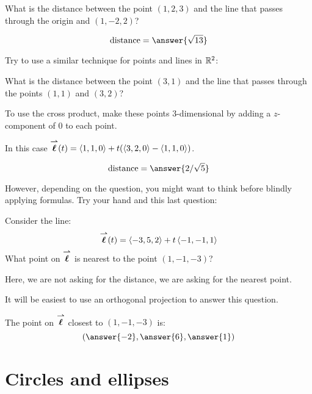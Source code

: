 \documentclass{ximera}
\begin{document}
\begin{question}
  What is the distance between the point $(1,2,3)$ and the line that
  passes through the origin and $(1,-2,2)$?
  \begin{prompt}
    \[
    \mathrm{distance} = \answer{\sqrt{13}}
    \]
  \end{prompt}
\end{question}

Try to use a similar technique for points and lines in $\mathbb R^2$:

\begin{question}
  What is the distance between the point $(3,1)$ and the line that
  passes through the points $(1,1)$ and $(3,2)$?
   \begin{hint}
    To use the cross product, make these points $3$-dimensional by
    adding a $z$-component of $0$ to each point.
  \end{hint}
  \begin{hint}
    In this case ${\overset{\boldsymbol{\rightharpoonup}}{\mathbf{\boldsymbol{\ell}}}}(t) = \left\langle 1,1,0\right\rangle + t
    (\left\langle 3,2,0\right\rangle-\left\langle 1,1,0\right\rangle)$.
  \end{hint}
  \begin{prompt}
    \[
    \mathrm{distance} = \answer{2/\sqrt{5}}
    \]
  \end{prompt}
\end{question}

However, depending on the question, you might want to think before
blindly applying formulas. Try your hand and this last question:

\begin{question}
  Consider the line:
  \[
  {\overset{\boldsymbol{\rightharpoonup}}{\mathbf{\boldsymbol{\ell}}}}(t) = \left\langle -3,5,2\right\rangle +t \left\langle -1,-1,1\right\rangle
  \]
  What point on ${\overset{\boldsymbol{\rightharpoonup}}{\mathbf{\boldsymbol{\ell}}}}$ is nearest to the point $(1,-1,-3)$?
  \begin{hint}
    Here, we are not asking for the distance, we are asking for the nearest point.
  \end{hint}
  \begin{hint}
    It will be easiest to use an orthogonal projection to answer this question.
  \end{hint}
  \begin{prompt}
    The point on ${\overset{\boldsymbol{\rightharpoonup}}{\mathbf{\boldsymbol{\ell}}}}$ closest to $(1,-1,-3)$ is:
    \[
    \left(\answer{-2},\answer{6},\answer{1}\right)
    \]
  \end{prompt}
\end{question}




\section{Circles and ellipses}
\end{document}
